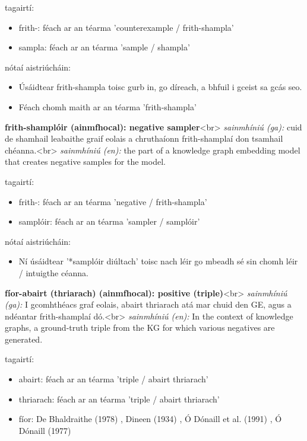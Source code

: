 \documentclass{article}
\begin{document}
tagairtí:
\begin{itemize}
	\item frith-: féach ar an téarma 'counterexample / frith-shampla'
	\item sampla: féach ar an téarma 'sample / shampla'
\end{itemize}

nótaí aistriúcháin:
\begin{itemize}
	\item Úsáidtear frith-shampla toisc gurb in, go díreach, a bhfuil i gceist sa gcás seo.
	\item Féach chomh maith ar an téarma 'frith-shampla'
\end{itemize}


\textbf{frith-shamplóir (ainmfhocal): negative sampler}<br>
\textit{sainmhíniú (ga):} cuid de shamhail leabaithe graif eolais a chruthaíonn frith-shamplaí don tsamhail chéanna.<br>
\textit{sainmhíniú (en):} the part of a knowledge graph embedding model that creates negative samples for the model.

tagairtí:
\begin{itemize}
	\item frith-: féach ar an téarma 'negative / frith-shampla'
	\item samplóir: féach ar an téarma 'sampler / samplóir'
\end{itemize}

nótaí aistriúcháin:
\begin{itemize}
	\item Ní úsáidtear '*samplóir diúltach' toisc nach léir go mbeadh sé sin chomh léir / intuigthe céanna.
\end{itemize}


\textbf{fíor-abairt (thriarach) (ainmfhocal): positive (triple)}<br>
\textit{sainmhíniú (ga):} I gcomhthéacs graf eolais, abairt thriarach atá mar chuid den GE, agus a ndéantar frith-shamplaí dó.<br>
\textit{sainmhíniú (en):} In the context of knowledge graphs, a ground-truth triple from the KG for which various negatives are generated.

tagairtí:
\begin{itemize}
	\item abairt: féach ar an téarma 'triple / abairt thriarach'
	\item thriarach: féach ar an téarma 'triple / abairt thriarach'
	\item fíor: De Bhaldraithe (1978) \cite{de-bhaldraithe}, Dineen (1934) \cite{dineen}, Ó Dónaill et al. (1991) \cite{focloir-beag}, Ó Dónaill (1977) \cite{odonaill}
\end{itemize}
\end{document}
